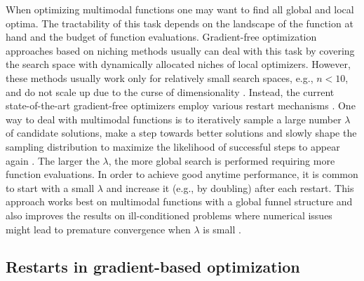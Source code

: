 \documentclass{article}
\begin{document}
When optimizing multimodal functions one may want to find all global and local optima. 
The tractability of this task depends on the landscape of the function at hand and the budget of function evaluations.  
Gradient-free optimization approaches based on niching methods \citep{preuss2015niching} usually can deal with this task 
by covering the search space with dynamically allocated niches of local optimizers. 
However, these methods usually work only for relatively small search spaces, e.g., $n < 10$, and 
do not scale up due to the curse of dimensionality \citep{preuss2010niching}. 
Instead, the current state-of-the-art gradient-free optimizers employ various restart 
mechanisms \citep{hansen2009benchmarking,loshchilov2012alternative}.  
One way to deal with multimodal functions is to iteratively sample a large number $\lambda$ 
of candidate solutions, make a step towards better solutions and slowly shape the sampling distribution to maximize the likelihood of successful steps to appear again \citep{hansen2004evaluating}. 
The larger the $\lambda$, the more global search is performed requiring more function evaluations. 
In order to achieve good anytime performance, it is common to start with a small $\lambda$ and increase it (e.g., by doubling) after each restart. This approach works best on multimodal functions with a global funnel structure 
and also improves the results on ill-conditioned problems where numerical issues might lead to premature convergence when $\lambda$ is small \citep{hansen2009benchmarking}.

\subsection{Restarts in gradient-based optimization}
\end{document}
